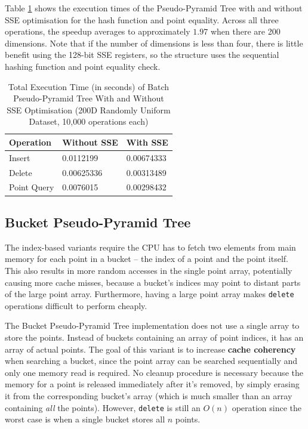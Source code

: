 Table \ref{tab:pseudo-pyramid-sse} shows the execution times of the Pseudo-Pyramid Tree with and without SSE optimisation for the hash function and point equality. Across all three operations, the speedup averages to approximately $1.97$ when there are 200 dimensions. Note that if the number of dimensions is less than four, there is little benefit using the 128-bit SSE registers, so the structure uses the sequential hashing function and point equality check.

\begin{table}
	\centering
	\begin{tabular}{|l|l|l|}
		\hline
		\textbf{Operation} & \textbf{Without SSE} & \textbf{With SSE} \\
		\hline
		Insert & 0.0112199 & 0.00674333 \\
		Delete & 0.00625336 & 0.00313489 \\
		Point Query & 0.0076015 & 0.00298432 \\
		\hline
	\end{tabular}
	\caption{Total Execution Time (in seconds) of Batch Pseudo-Pyramid Tree With and Without SSE Optimisation (200D Randomly Uniform Dataset, 10,000 operations each)}
	\label{tab:pseudo-pyramid-sse}
\end{table}

\subsection{Bucket Pseudo-Pyramid Tree}

The index-based variants require the CPU has to fetch two elements from main memory for each point in a bucket -- the index of a point and the point itself. This also results in more random accesses in the single point array, potentially causing more cache misses, because a bucket's indices may point to distant parts of the large point array. Furthermore, having a large point array makes \texttt{delete} operations difficult to perform cheaply.

The Bucket Pseudo-Pyramid Tree implementation does not use a single array to store the points. Instead of buckets containing an array of point indices, it has an array of actual points. The goal of this variant is to increase \textbf{cache coherency} when searching a bucket, since the point array can be searched sequentially and only one memory read is required. No cleanup procedure is necessary because the memory for a point is released immediately after it's removed, by simply erasing it from the corresponding bucket's array (which is much smaller than an array containing \textit{all} the points). However, \texttt{delete} is still an $O(n)$ operation since the worst case is when a single bucket stores all $n$ points.

